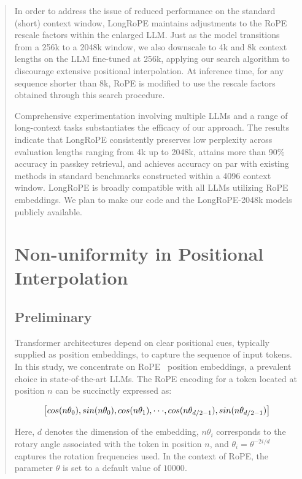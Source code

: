 \begin{abstract}
In order to address the issue of reduced performance on the standard (short) context window, {LongRoPE} maintains adjustments to the RoPE rescale factors within the enlarged LLM. Just as the model transitions from a 256k to a 2048k window, we also downscale to 4k and 8k context lengths on the LLM fine-tuned at 256k, applying our search algorithm to discourage extensive positional interpolation. At inference time, for any sequence shorter than 8k, RoPE is modified to use the rescale factors obtained through this search procedure.

Comprehensive experimentation involving multiple LLMs and a range of long-context tasks substantiates the efficacy of our approach. The results indicate that LongRoPE consistently preserves low perplexity across evaluation lengths ranging from 4k up to 2048k, attains more than 90\% accuracy in passkey retrieval, and achieves accuracy on par with existing methods in standard benchmarks constructed within a 4096 context window. LongRoPE is broadly compatible with all LLMs utilizing RoPE embeddings. We plan to make our code and the LongRoPE-2048k models publicly available.

\section{Non-uniformity in Positional Interpolation}
\label{sec:analysis}

\subsection{Preliminary}

Transformer architectures depend on clear positional cues, typically supplied as position embeddings, to capture the sequence of input tokens. In this study, we concentrate on RoPE~\cite{rope} position embeddings, a prevalent choice in state-of-the-art LLMs. The RoPE encoding for a token located at position $n$ can be succinctly expressed as:

\begin{equation}
		\fontsize{7.8}{7.8} \selectfont
	\label{eq:rope}
	\left[ cos(n\theta_0), sin(n\theta_0), cos(n\theta_1), \cdot\cdot\cdot, cos(n\theta_{d/2-1}), sin(n\theta_{d/2-1}) \right]   
\end{equation}

Here, $d$ denotes the dimension of the embedding, 
$n\theta_i$ corresponds to the rotary angle associated with the token in position $n$, and 
$\theta_i = \theta^{-2i/d}$ captures the rotation frequencies used. In the context of RoPE, the parameter $\theta$ is set to a default value of $10000$.


\end{abstract}
